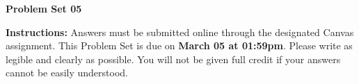\documentclass[12pt]{exam}
\newcommand{\examdate}{\fontfamily{lmss}\selectfont \textbf{March 05 at 01:59pm}} %
\begin{document}
\selectfont

\begin{center}
    \textbf{{\LARGE Problem Set 05}} \\
    \bigskip 
\end{center}

\noindent \textbf{Instructions:} 
Answers must be submitted online through the designated Canvas assignment. 
This Problem Set is due on \examdate.
Please write as legible and clearly as possible. 
You will not be given full credit if your answers cannot be easily understood. 


\end{document}
